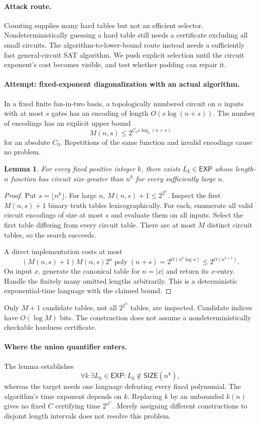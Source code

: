 \documentclass[11pt,a4paper]{article}
\newtheorem{notebooklemma}{Lemma}[section]
\numberwithin{equation}{section}
\begin{document}
\paragraph{Attack route.}
Counting supplies many hard tables but not an efficient selector. Nondeterministically guessing a hard table still needs a certificate excluding all small circuits. The algorithm-to-lower-bound route instead needs a sufficiently fast general-circuit SAT algorithm. We push explicit selection until the circuit exponent's cost becomes visible, and test whether padding can repair it.

\paragraph{Attempt: fixed-exponent diagonalization with an actual algorithm.}
In a fixed finite fan-in-two basis, a topologically numbered circuit on $n$ inputs with at most $s$ gates has an encoding of length $O(s\log(n+s))$. The number of encodings has an explicit upper bound
\[
 M(n,s)\le2^{C_0s\log_2(n+s)}
\]
for an absolute $C_0$. Repetitions of the same function and invalid encodings cause no problem.
\begin{notebooklemma}\label{r63:fixed}
For every fixed positive integer $k$, there exists $L_k\in\mathsf{EXP}$ whose length-$n$ function has circuit size greater than $n^k$ for every sufficiently large $n$.
\end{notebooklemma}
\begin{proof}
Put $s=\lfloor n^k\rfloor$. For large $n$, $M(n,s)+1\le2^{2^n}$. Inspect the first $M(n,s)+1$ binary truth tables lexicographically. For each, enumerate all valid circuit encodings of size at most $s$ and evaluate them on all inputs. Select the first table differing from every circuit table. There are at most $M$ distinct circuit tables, so the search succeeds.

A direct implementation costs at most
\[
 (M(n,s)+1)M(n,s)2^n\operatorname{poly}(n+s)
        =2^{O(n^k\log n)}\le2^{O(n^{k+1})}.
\]
On input $x$, generate the canonical table for $n=|x|$ and return its $x$-entry. Handle the finitely many omitted lengths arbitrarily. This is a deterministic exponential-time language with the claimed bound.
\end{proof}
Only $M+1$ candidate tables, not all $2^{2^n}$ tables, are inspected. Candidate indices have $O(\log M)$ bits. The construction does not assume a nondeterministically checkable hardness certificate.

\paragraph{Where the union quantifier enters.}
The lemma establishes
\[
 \forall k\ \exists L_k\in\mathsf{EXP}:L_k\notin\mathsf{SIZE}(n^k),
\]
whereas the target needs one language defeating every fixed polynomial. The algorithm's time exponent depends on $k$. Replacing $k$ by an unbounded $k(n)$ gives no fixed $C$ certifying time $2^{n^C}$. Merely assigning different constructions to disjoint length intervals does not resolve this problem.
\end{document}
